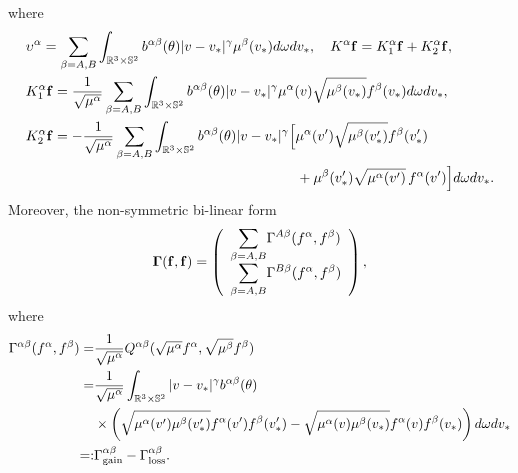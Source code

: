 \documentclass[reqno]{amsart}
\numberwithin{equation}{section}
\numberwithin{equation}{section}
\begin{document}
where
\begin{equation}\label{nuKsuanzidef}
	\begin{split}
		&\upsilon^{\alpha}=   \sum_{\beta=A,B} \int_{\mathbb{R}^3\times \mathbb{S}^2}
		b^{\alpha\beta}(\theta)|v-v_*|^{\gamma} \mu^{\beta}(v_*) d\omega dv_*, \quad  K^{\alpha} \mathbf{f}= K_{1}^{\alpha} \mathbf{f}+K_{2}^{\alpha} \mathbf{f},
		\\
		&	 K_{1}^{\alpha} \mathbf{f}=  \frac{1}{\sqrt{\mu^\alpha}} \sum_{\beta=A,B} \int_{\mathbb{R}^3 \times \mathbb{S}^2}
		b^{\alpha\beta}(\theta)|v-v_*|^{\gamma}  \mu^\alpha(v) \sqrt{\mu^\beta(v_*)}f^\beta(v_*)   d\omega dv_*,\\
		&	 K_{2}^{\alpha} \mathbf{f}= - \frac{1}{\sqrt{\mu^\alpha}} \sum_{\beta=A,B} \int_{\mathbb{R}^3 \times \mathbb{S}^2}
		b^{\alpha\beta}(\theta)|v-v_*|^{\gamma}  \Big[\mu^\alpha(v')\sqrt{\mu^\beta(v_*')}f^\beta(v_*')\\
		& \hspace{6.8cm} +\mu^{\beta}(v_*') \sqrt{\mu^{\alpha}(v')}\, f^\alpha(v')\Big] d\omega dv_*.
	\end{split}	
\end{equation}	
Moreover, the non-symmetric bi-linear form  
\begin{gather}\label{Blackgamdef}
	\begin{split}
		\bf{\Gamma}(f,f) = \left(\begin{array} {lll} \displaystyle{\sum_{\beta=A,B}} \Gamma^{A \beta }(f^{\alpha},f^{\beta})\\ \displaystyle{\sum_{\beta=A,B}}\Gamma^{B \beta }(f^{\alpha},f^{\beta})\end{array}\right),
	\end{split}	
\end{gather}
where
\begin{eqnarray}\label{gain loss part}
	\begin{split}
		\Gamma^{\alpha \beta }(f^{\alpha},f^{\beta})= & \frac{1}{\sqrt{\mu^{\alpha }}}Q^{ \alpha \beta}(\sqrt{\mu^{\alpha }}f^{\alpha},  \sqrt{\mu^{\beta }}f^{\beta})\\
		= &  \frac{1}{\sqrt{\mu^{\alpha }}}\int_{\mathbb{R}^3\times \mathbb{S}^2}|v-v_*|^{\gamma}b^{\alpha \beta}(\theta)\\
		&  \times \left(\sqrt{\mu^{\alpha }(v') \mu^{\beta }(v_*')}f^{\alpha}(v')f^{\beta}(v_*')
		-\sqrt{\mu^{\alpha }(v)\mu^{\beta }(v_*)}f^{\alpha}(v)f^{\beta}(v_*)\right)d\omega dv_* \\
		=:& \Gamma^{\alpha \beta }_{\rm gain} - \Gamma^{\alpha \beta }_{\rm loss}.
	\end{split}
\end{eqnarray}
\end{document}
